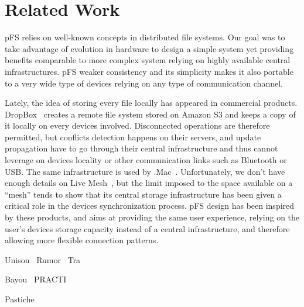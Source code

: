 
\section{Related Work}


pFS relies on well-known concepts in distributed file systems. Our
goal was to take advantage of evolution in hardware to design a simple
system yet providing benefits comparable to more complex system
relying on highly available central infrastructures. pFS weaker
consistency and its simplicity makes it also portable to a very wide
type of devices relying on any type of communication channel.

Lately, the idea of storing every file locally has appeared in
commercial products. DropBox~\cite{houston:dropbox} creates a remote
file system stored on Amazon S3 and keeps a copy of it locally on
every devices involved. Disconnected operations are therefore
permitted, but conflicts detection happens on their servers, and
update propagation have to go through their central infrastructure and
thus cannot leverage on devices locality or other communication links
such as Bluetooth or USB. The same infrastructure is used by
.Mac~\cite{apple:mac}. Unfortunately, we don't have enough details on
Live Mesh~\cite{microsoft:livemesh}, but the limit imposed to the space
available on a ``mesh'' tends to show that its central storage
infrastructure has been given a critical role in the devices
synchronization process. pFS design has been inspired by these
products, and aims at providing the same user experience, relying on
the user's devices storage capacity instead of a central
infrastructure, and therefore allowing more flexible connection
patterns.

Unison~\cite{balasubramanian:unison}
Rumor~\cite{guy:rumor}
Tra~\cite{cox:tra}

Bayou~\cite{petersen:flexible-update}
PRACTI~\cite{belaramani:pract}

Pastiche~\cite{cox:pastiche,nguyen:friendstore}


